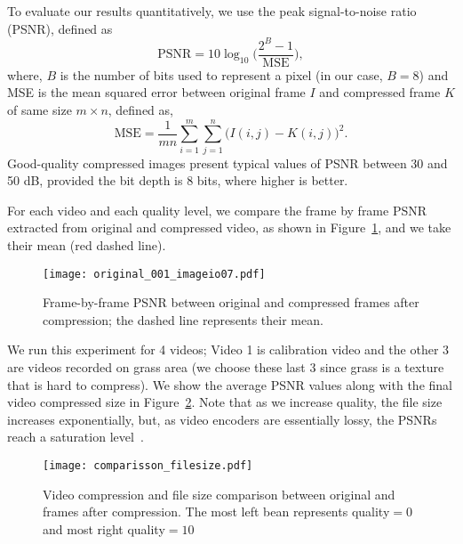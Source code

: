 To evaluate our results quantitatively, we use the peak signal-to-noise ratio (PSNR), defined as
%
\begin{equation}
    \textrm{PSNR} = 10\log_{10}\bigg({\frac{2^B-1}{\textrm{MSE}}}\bigg),
    \label{eq:psnr}
\end{equation}
%
where, $B$ is the number of bits used to represent a pixel (in our case, $B=8$) and MSE is the mean squared error between original frame $I$ and compressed frame $K$ of same size $m\times n$, defined as,
%
\begin{equation}
    \textrm{MSE} = \frac{1}{mn} \sum_{i=1}^{m}\sum_{j=1}^{n} \bigg(I(i,j) - K(i,j) \bigg)^2.
    \label{eq:mse}
\end{equation}
%
%
Good-quality compressed images present typical values of PSNR between 30 and 50 dB, provided the bit depth is 8 bits, where higher is better.

For each video and each quality level, we compare the frame by frame PSNR extracted from original and compressed video, as shown in Figure~\ref{fig:vid_psnr}, and we take their mean (red dashed line).
%
\begin{figure}[htb]
	\centering
	\texttt{[image: original\_001\_imageio07.pdf]}
	\caption[Frame-by-frame PSNR between original and compressed frames after compression.]
	{Frame-by-frame PSNR between original and compressed frames after compression; the dashed line represents their mean.}
	\label{fig:vid_psnr}
\end{figure}
%
We run this experiment for 4 videos; Video 1 is calibration video and the other 3 are videos recorded on grass area (we choose these last 3 since grass is a texture that is hard to compress).
We show the average PSNR values along with the final video compressed size in Figure~\ref{fig:compression_comp}.
Note that as we increase quality, the file size increases exponentially,
but, as video encoders are essentially lossy, the PSNRs reach a saturation level~\cite{web:ffmpeg}.
%
%
\begin{figure}[hbt!]
	\centering
	\texttt{[image: comparisson\_filesize.pdf]}
	\caption[Video compression and file size comparison]{Video compression and file size comparison between original and frames after compression.
	The most left bean represents quality$=0$ and most right  quality$=10$}
	\label{fig:compression_comp}
\end{figure}
%

